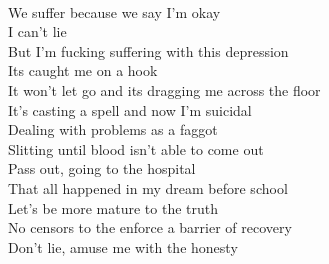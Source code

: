\documentclass[12pt, b5paper, oneside]{book}
\begin{document}
\\We suffer because we say I'm okay
\\I can't lie
\\But I'm fucking suffering with this depression
\\Its caught me on a hook
\\It won't let go and its dragging me across the floor
\\It's casting a spell and now I'm suicidal
\\Dealing with problems as a faggot
\\Slitting until blood isn't able to come out
\\Pass out, going to the hospital
\\That all happened in my dream before school
\\Let's be more mature to the truth
\\No censors to the enforce a barrier of recovery
\\Don't lie, amuse me with the honesty 
\newpage
\end{document}

